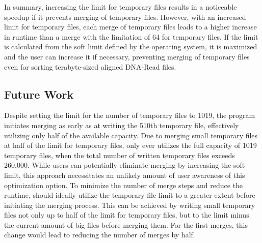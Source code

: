 In summary, increasing the limit for temporary files results in a noticeable speedup if it prevents merging of temporary files. However, with an increased limit for temporary files, each merge of temporary files leads to a higher increase in runtime than a merge with the limitation of 64 for temporary files. If the limit is calculated from the soft limit defined by the operating system, it is maximized and the user can increase it if necessary, preventing merging of temporary files even for sorting terabyte-sized aligned DNA-Read files. 

\subsection{Future Work}
Despite setting the limit for the number of temporary files to 1019, the program initiates merging as early as at writing the 510th temporary file, effectively utilizing only half of the available capacity. Due to merging small temporary files at half of the limit for temporary files, \sort only ever utilizes the full capacity of 1019 temporary files, when the total number of written temporary files exceeds 260,000. While users can potentially eliminate merging by increasing the soft limit, this approach necessitates an unlikely amount of user awareness of this optimization option. To minimize the number of merge steps and reduce the runtime, \sort should ideally utilize the temporary file limit to a greater extent before initiating the merging process. This can be achieved by writing small temporary files not only up to half of the limit for temporary files, but to the limit minus the current amount of big files before merging them. For the first merges, this change would lead to reducing the number of merges by half.